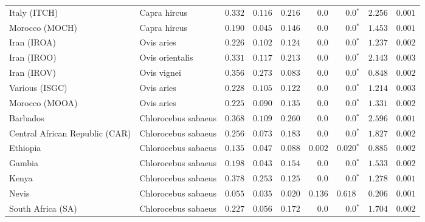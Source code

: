 \begin{center}
\begin{adjustbox}{width = 1\textwidth}
\begin{tabular}{|l|l|r|r|r|r|r|r|r|}
            Italy (ITCH)                    & Capra hircus          & $ 0.332$ & $ 0.116$ & $ 0.216$ & $0.0$    & $\bm{0.0{^*}}$    & $ 2.256$ & $ 0.001$  \\
            Morocco (MOCH)                    & Capra hircus     & $ 0.190$ & $ 0.045$ & $ 0.146$ & $0.0$    & $\bm{0.0{^*}}$    & $ 1.453$ & $ 0.001$ \\
            Iran (IROA)                    & Ovis aries         & $ 0.226$ & $ 0.102$ & $ 0.124$ & $0.0$    & $\bm{0.0{^*}}$    & $ 1.237$ & $ 0.002$ \\
            Iran (IROO)                 & Ovis orientalis          & $ 0.331$ & $ 0.117$ & $ 0.213$ & $0.0$    & $\bm{0.0{^*}}$    & $ 2.143$ & $ 0.003$ \\
            Iran (IROV)                 & Ovis vignei          & $ 0.356$ & $ 0.273$ & $ 0.083$ & $0.0$    & $\bm{0.0{^*}}$    & $ 0.848$ & $ 0.002$ \\
            Various (ISGC)                       & Ovis aries & $ 0.228$ & $ 0.105$ & $ 0.122$ & $0.0$    & $\bm{0.0{^*}}$    & $ 1.214$ & $ 0.003$ \\
            Morocco (MOOA) & Ovis aries & $ 0.225$ & $ 0.090$ & $ 0.135$ & $0.0$ & $\bm{0.0{^*}}$ & $ 1.331$ & $ 0.002$ \\
            Barbados                       & Chlorocebus sabaeus & $ 0.368$ & $ 0.109$ & $ 0.260$ & $0.0$ & $\bm{0.0{^*}}$ & $ 2.596$ & $ 0.001$ \\
            Central African Republic (CAR)                         & Chlorocebus sabaeus & $ 0.256$ & $ 0.073$ & $ 0.183$ & $0.0$    & $\bm{0.0{^*}}$    & $ 1.827$ & $ 0.002$ \\
            Ethiopia                          & Chlorocebus sabaeus & $ 0.135$ & $ 0.047$ & $ 0.088$ & $ 0.002$    & $\bm{ 0.020{^*}}$    & $ 0.885$ & $ 0.002$ \\
            Gambia                          & Chlorocebus sabaeus & $ 0.198$ & $ 0.043$ & $ 0.154$ & $0.0$ & $\bm{0.0{^*}}$        & $ 1.533$ & $ 0.002$ \\
            Kenya              & Chlorocebus sabaeus & $ 0.378$ & $ 0.253$ & $ 0.125$ & $0.0$    & $\bm{0.0{^*}}$ & $ 1.278$ & $ 0.001$ \\
            Nevis               & Chlorocebus sabaeus & $ 0.055$ & $ 0.035$ & $ 0.020$ & $ 0.136$ & $ 0.618~~$ & $ 0.206$ & $ 0.001$ \\
            South Africa (SA)                         & Chlorocebus sabaeus & $ 0.227$ & $ 0.056$ & $ 0.172$ & $0.0$ & $\bm{0.0{^*}}$        & $ 1.704$ & $ 0.002$ \\

\end{tabular}
\end{adjustbox}
\end{center}

